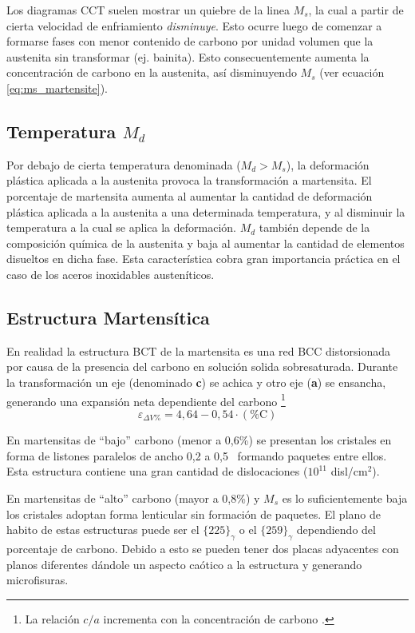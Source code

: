 Los diagramas CCT suelen mostrar un quiebre de la linea $M_s$, la cual a partir de cierta velocidad de enfriamiento \textit{disminuye}. Esto ocurre luego de comenzar a formarse fases con menor contenido de carbono por unidad volumen que la austenita sin transformar (ej. bainita). Esto consecuentemente aumenta la concentración de carbono en la austenita, así disminuyendo $M_s$ (ver ecuación \eqref{eq:ms_martensite}).

\subsection[Temperatura {\it Md}]{Temperatura $M_d$}
Por debajo de cierta temperatura denominada ($M_d> M_s$), la
deformación plástica aplicada a la austenita provoca la transformación a martensita. El porcentaje de martensita aumenta al aumentar la cantidad de deformación plástica aplicada a la austenita a una determinada temperatura, y al disminuir la temperatura a la cual se aplica la deformación. $M_d$ también depende de la composición química de la austenita y baja al aumentar la cantidad de elementos disueltos en dicha fase. Esta característica cobra gran importancia práctica en el caso de los aceros inoxidables austeníticos. 

\subsection{Estructura Martensítica}
En realidad la estructura BCT de la martensita es una red BCC distorsionada por causa de la presencia del carbono en solución solida sobresaturada. Durante la transformación un eje (denominado \textbf{c}) se achica y otro eje (\textbf{a}) se ensancha, generando una expansión neta dependiente del carbono \footnote{La relación $c/a$ incrementa con la concentración de carbono \cite{gottstein2013physical}.}
\[
\varepsilon_{\Delta V \%} = 4,64-0,54\cdot (\% \mathrm{C})
\]



En martensitas de ``bajo'' carbono (menor a 0,6\%) se presentan los cristales en forma de listones paralelos de ancho 0,2 a 0,5\um~  formando paquetes entre ellos. Esta estructura contiene una gran cantidad de dislocaciones ($10^{11}$ disl/cm$^2$).

En martensitas de ``alto'' carbono (mayor a 0,8\%) y $M_s$ es lo suficientemente baja los cristales adoptan forma lenticular sin formación de paquetes. El plano de habito de estas estructuras puede ser el $\{225 \}_\gamma$ o el $\{259 \}_\gamma$ dependiendo del porcentaje de carbono. Debido a esto se pueden tener dos placas adyacentes con planos diferentes dándole un aspecto caótico a la estructura y generando microfisuras.

